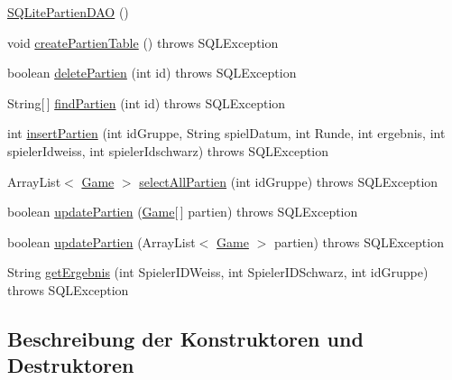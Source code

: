 \begin{DoxyCompactItemize}
\item 
\hyperlink{classde_1_1turnierverwaltung_1_1mysql_1_1_s_q_lite_partien_d_a_o_a8738f3414be9303817dbe44dea37222a}{S\+Q\+Lite\+Partien\+D\+AO} ()
\item 
void \hyperlink{classde_1_1turnierverwaltung_1_1mysql_1_1_s_q_lite_partien_d_a_o_aaa4981f0bdeade730c99a36e62e05173}{create\+Partien\+Table} ()  throws S\+Q\+L\+Exception 
\item 
boolean \hyperlink{classde_1_1turnierverwaltung_1_1mysql_1_1_s_q_lite_partien_d_a_o_a0aa8cb5d4d3564cb1127a36f588b14c7}{delete\+Partien} (int id)  throws S\+Q\+L\+Exception 
\item 
String\mbox{[}$\,$\mbox{]} \hyperlink{classde_1_1turnierverwaltung_1_1mysql_1_1_s_q_lite_partien_d_a_o_a5dcafe092ef9ce2666eb1b294be31ae7}{find\+Partien} (int id)  throws S\+Q\+L\+Exception 
\item 
int \hyperlink{classde_1_1turnierverwaltung_1_1mysql_1_1_s_q_lite_partien_d_a_o_aa51823bca9f57b6335921b2200ee1632}{insert\+Partien} (int id\+Gruppe, String spiel\+Datum, int Runde, int ergebnis, int spieler\+Idweiss, int spieler\+Idschwarz)  throws S\+Q\+L\+Exception 
\item 
Array\+List$<$ \hyperlink{classde_1_1turnierverwaltung_1_1model_1_1_game}{Game} $>$ \hyperlink{classde_1_1turnierverwaltung_1_1mysql_1_1_s_q_lite_partien_d_a_o_a06115e94cfdace76ff2b4eb56b416b8a}{select\+All\+Partien} (int id\+Gruppe)  throws S\+Q\+L\+Exception 
\item 
boolean \hyperlink{classde_1_1turnierverwaltung_1_1mysql_1_1_s_q_lite_partien_d_a_o_af82d3eb16e7b9838ebf25d2fdc8faec9}{update\+Partien} (\hyperlink{classde_1_1turnierverwaltung_1_1model_1_1_game}{Game}\mbox{[}$\,$\mbox{]} partien)  throws S\+Q\+L\+Exception 
\item 
boolean \hyperlink{classde_1_1turnierverwaltung_1_1mysql_1_1_s_q_lite_partien_d_a_o_ac1a04e48f42f6330c0b1f21b8e875bd2}{update\+Partien} (Array\+List$<$ \hyperlink{classde_1_1turnierverwaltung_1_1model_1_1_game}{Game} $>$ partien)  throws S\+Q\+L\+Exception 
\item 
String \hyperlink{classde_1_1turnierverwaltung_1_1mysql_1_1_s_q_lite_partien_d_a_o_a1872e8758eea226c21cd63fdfa6eaef6}{get\+Ergebnis} (int Spieler\+I\+D\+Weiss, int Spieler\+I\+D\+Schwarz, int id\+Gruppe)  throws S\+Q\+L\+Exception 
\end{DoxyCompactItemize}


\subsection{Beschreibung der Konstruktoren und Destruktoren}
